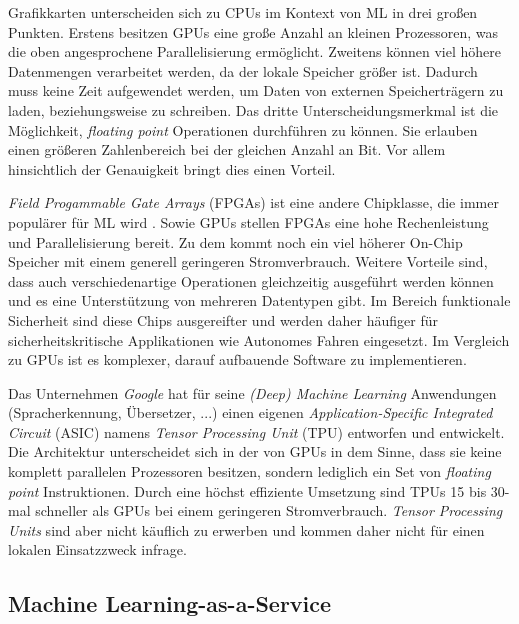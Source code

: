 Grafikkarten unterscheiden sich zu CPUs im Kontext von ML in drei großen Punkten. Erstens besitzen GPUs eine große Anzahl an kleinen Prozessoren, was die oben angesprochene Parallelisierung ermöglicht. Zweitens können viel höhere Datenmengen verarbeitet werden, da der lokale Speicher größer ist. Dadurch muss keine Zeit aufgewendet werden, um Daten von externen Speicherträgern zu laden, beziehungsweise zu schreiben. Das dritte Unterscheidungsmerkmal ist die Möglichkeit, \textit{floating point} Operationen durchführen zu können. Sie erlauben einen größeren Zahlenbereich bei der gleichen Anzahl an Bit. Vor allem hinsichtlich der Genauigkeit bringt dies einen Vorteil.

\textit{Field Progammable Gate Arrays} (FPGAs) ist eine andere Chipklasse, die immer populärer für ML wird \cite{Rebala2019}. Sowie GPUs stellen FPGAs eine hohe Rechenleistung und Parallelisierung bereit. Zu dem kommt noch ein viel höherer On-Chip Speicher mit einem generell geringeren Stromverbrauch. Weitere Vorteile sind, dass auch verschiedenartige Operationen gleichzeitig ausgeführt werden können und es eine Unterstützung von mehreren Datentypen gibt. Im Bereich funktionale Sicherheit sind diese Chips ausgereifter und werden daher häufiger für sicherheitskritische Applikationen wie Autonomes Fahren eingesetzt. Im Vergleich zu GPUs ist es komplexer, darauf aufbauende Software zu implementieren.

Das Unternehmen \textit{Google} hat für seine \textit{(Deep) Machine Learning} Anwendungen (Spracherkennung, Übersetzer, ...) einen eigenen \textit{Application-Specific Integrated Circuit} (ASIC) namens \textit{Tensor Processing Unit} (TPU) entworfen und entwickelt. Die Architektur unterscheidet sich in der von GPUs in dem Sinne, dass sie keine komplett parallelen Prozessoren besitzen, sondern lediglich ein Set von \textit{floating point} Instruktionen. Durch eine höchst effiziente Umsetzung sind TPUs 15 bis 30-mal schneller als GPUs bei einem geringeren Stromverbrauch. \textit{Tensor Processing Units} sind aber nicht käuflich zu erwerben und kommen daher nicht für einen lokalen Einsatzzweck infrage.

\subsection{Machine Learning-as-a-Service}
\label{sec:ml_as_a_service}

